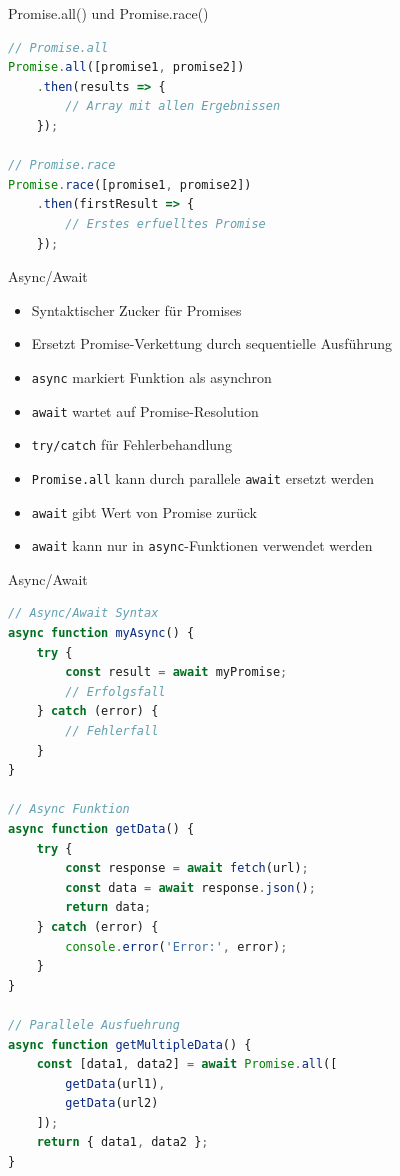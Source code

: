 \begin{KR}{Promise.all() und Promise.race()}
\begin{lstlisting}[language=JavaScript, style=basesmol]
// Promise.all
Promise.all([promise1, promise2])
    .then(results => {
        // Array mit allen Ergebnissen
    });

// Promise.race
Promise.race([promise1, promise2])
    .then(firstResult => {
        // Erstes erfuelltes Promise
    });
\end{lstlisting}
\end{KR}

\begin{definition}{Async/Await}
\begin{itemize}
  \item Syntaktischer Zucker für Promises
  \item Ersetzt Promise-Verkettung durch sequentielle Ausführung
  \item \texttt{async} markiert Funktion als asynchron
  \item \texttt{await} wartet auf Promise-Resolution
  \item \texttt{try/catch} für Fehlerbehandlung
  \item \texttt{Promise.all} kann durch parallele \texttt{await} ersetzt werden
  \item \texttt{await} gibt Wert von Promise zurück
  \item \texttt{await} kann nur in \texttt{async}-Funktionen verwendet werden
\end{itemize}
\end{definition}

\begin{KR}{Async/Await}
\begin{lstlisting}[language=JavaScript, style=basesmol]
// Async/Await Syntax
async function myAsync() {
    try {
        const result = await myPromise;
        // Erfolgsfall
    } catch (error) {
        // Fehlerfall
    }
}

// Async Funktion
async function getData() {
    try {
        const response = await fetch(url);
        const data = await response.json();
        return data;
    } catch (error) {
        console.error('Error:', error);
    }
}

// Parallele Ausfuehrung
async function getMultipleData() {
    const [data1, data2] = await Promise.all([
        getData(url1),
        getData(url2)
    ]);
    return { data1, data2 };
}
\end{lstlisting}
\end{KR}



